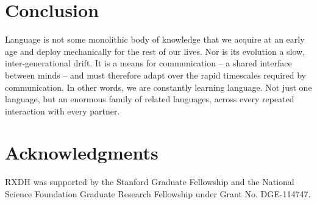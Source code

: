 \documentclass[11pt, floatsintext, man]{apa6}
\begin{document}
\section{Conclusion}

Language is not some monolithic body of knowledge that we acquire at an early age and deploy mechanically for the rest of our lives. Nor is its evolution a slow, inter-generational drift. It is a means for communication -- a shared interface between minds -- and must therefore adapt over the rapid timescales required by communication. In other words, we are constantly learning language. Not just one language, but an enormous family of related languages, across every repeated interaction with every partner. 


\section{\bf Acknowledgments}
\small
\noindent RXDH was supported by the Stanford Graduate Fellowship and the National Science Foundation Graduate Research Fellowship under Grant No. DGE-114747.



\end{document}
